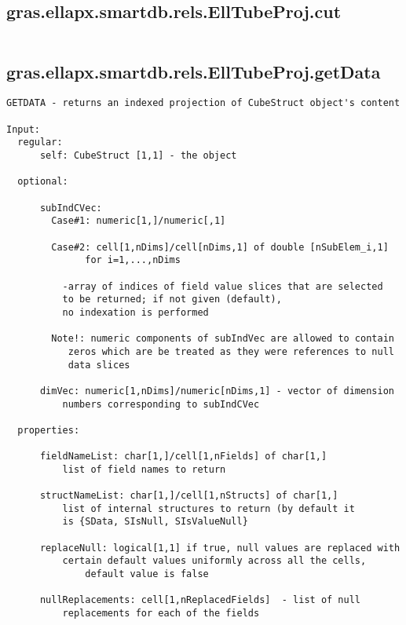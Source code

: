 \subsection{\texorpdfstring{gras.ellapx.smartdb.rels.EllTubeProj.cut}{cut}}\label{method:gras.ellapx.smartdb.rels.EllTubeProj.cut}
\begin{verbatim}

\end{verbatim}
\subsection{\texorpdfstring{gras.ellapx.smartdb.rels.EllTubeProj.getData}{getData}}\label{method:gras.ellapx.smartdb.rels.EllTubeProj.getData}
\begin{verbatim}
GETDATA - returns an indexed projection of CubeStruct object's content

Input:
  regular:
      self: CubeStruct [1,1] - the object

  optional:

      subIndCVec:
        Case#1: numeric[1,]/numeric[,1]

        Case#2: cell[1,nDims]/cell[nDims,1] of double [nSubElem_i,1]
              for i=1,...,nDims

          -array of indices of field value slices that are selected
          to be returned; if not given (default),
          no indexation is performed

        Note!: numeric components of subIndVec are allowed to contain
           zeros which are be treated as they were references to null
           data slices

      dimVec: numeric[1,nDims]/numeric[nDims,1] - vector of dimension
          numbers corresponding to subIndCVec

  properties:

      fieldNameList: char[1,]/cell[1,nFields] of char[1,]
          list of field names to return

      structNameList: char[1,]/cell[1,nStructs] of char[1,]
          list of internal structures to return (by default it
          is {SData, SIsNull, SIsValueNull}

      replaceNull: logical[1,1] if true, null values are replaced with
          certain default values uniformly across all the cells,
              default value is false

      nullReplacements: cell[1,nReplacedFields]  - list of null
          replacements for each of the fields


\end{verbatim}
